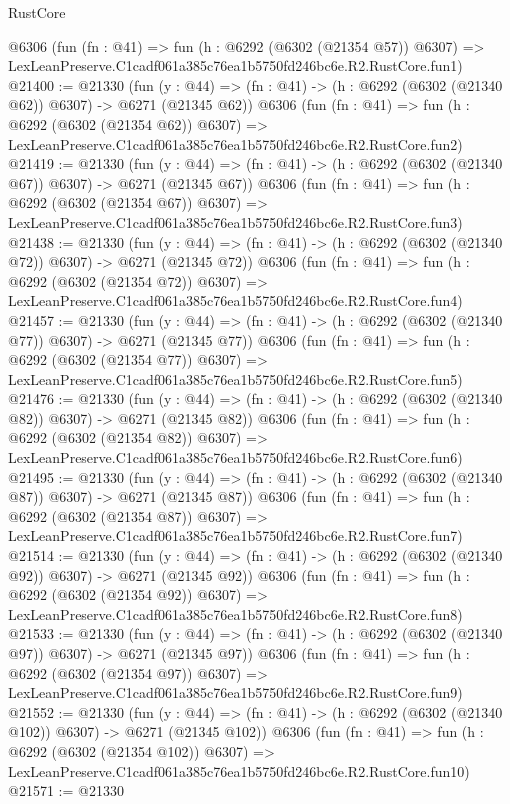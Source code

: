\begin{lexlean}{RustCore}
\begin{coremodule}
    @6306
    (fun (fn : @41) =>
    fun (h : @6292 (@6302 (@21354 @57)) @6307) =>
    LexLeanPreserve.C1cadf061a385c76ea1b5750fd246bc6e.R2.RustCore.fun1)
@21400 := @21330
    (fun (y : @44) => (fn : @41) -> (h : @6292 (@6302 (@21340 @62)) @6307) -> @6271 (@21345 @62))
    @6306
    (fun (fn : @41) =>
    fun (h : @6292 (@6302 (@21354 @62)) @6307) =>
    LexLeanPreserve.C1cadf061a385c76ea1b5750fd246bc6e.R2.RustCore.fun2)
@21419 := @21330
    (fun (y : @44) => (fn : @41) -> (h : @6292 (@6302 (@21340 @67)) @6307) -> @6271 (@21345 @67))
    @6306
    (fun (fn : @41) =>
    fun (h : @6292 (@6302 (@21354 @67)) @6307) =>
    LexLeanPreserve.C1cadf061a385c76ea1b5750fd246bc6e.R2.RustCore.fun3)
@21438 := @21330
    (fun (y : @44) => (fn : @41) -> (h : @6292 (@6302 (@21340 @72)) @6307) -> @6271 (@21345 @72))
    @6306
    (fun (fn : @41) =>
    fun (h : @6292 (@6302 (@21354 @72)) @6307) =>
    LexLeanPreserve.C1cadf061a385c76ea1b5750fd246bc6e.R2.RustCore.fun4)
@21457 := @21330
    (fun (y : @44) => (fn : @41) -> (h : @6292 (@6302 (@21340 @77)) @6307) -> @6271 (@21345 @77))
    @6306
    (fun (fn : @41) =>
    fun (h : @6292 (@6302 (@21354 @77)) @6307) =>
    LexLeanPreserve.C1cadf061a385c76ea1b5750fd246bc6e.R2.RustCore.fun5)
@21476 := @21330
    (fun (y : @44) => (fn : @41) -> (h : @6292 (@6302 (@21340 @82)) @6307) -> @6271 (@21345 @82))
    @6306
    (fun (fn : @41) =>
    fun (h : @6292 (@6302 (@21354 @82)) @6307) =>
    LexLeanPreserve.C1cadf061a385c76ea1b5750fd246bc6e.R2.RustCore.fun6)
@21495 := @21330
    (fun (y : @44) => (fn : @41) -> (h : @6292 (@6302 (@21340 @87)) @6307) -> @6271 (@21345 @87))
    @6306
    (fun (fn : @41) =>
    fun (h : @6292 (@6302 (@21354 @87)) @6307) =>
    LexLeanPreserve.C1cadf061a385c76ea1b5750fd246bc6e.R2.RustCore.fun7)
@21514 := @21330
    (fun (y : @44) => (fn : @41) -> (h : @6292 (@6302 (@21340 @92)) @6307) -> @6271 (@21345 @92))
    @6306
    (fun (fn : @41) =>
    fun (h : @6292 (@6302 (@21354 @92)) @6307) =>
    LexLeanPreserve.C1cadf061a385c76ea1b5750fd246bc6e.R2.RustCore.fun8)
@21533 := @21330
    (fun (y : @44) => (fn : @41) -> (h : @6292 (@6302 (@21340 @97)) @6307) -> @6271 (@21345 @97))
    @6306
    (fun (fn : @41) =>
    fun (h : @6292 (@6302 (@21354 @97)) @6307) =>
    LexLeanPreserve.C1cadf061a385c76ea1b5750fd246bc6e.R2.RustCore.fun9)
@21552 := @21330
    (fun (y : @44) => (fn : @41) -> (h : @6292 (@6302 (@21340 @102)) @6307) -> @6271 (@21345 @102))
    @6306
    (fun (fn : @41) =>
    fun (h : @6292 (@6302 (@21354 @102)) @6307) =>
    LexLeanPreserve.C1cadf061a385c76ea1b5750fd246bc6e.R2.RustCore.fun10)
@21571 := @21330

\end{coremodule}
\end{lexlean}
